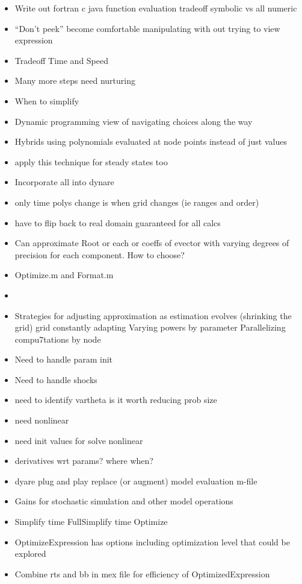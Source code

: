 \documentclass[12pt]{article}
\begin{document}
\begin{itemize}
\item Write out fortran c java function evaluation tradeoff symbolic vs all numeric
\item ``Don't peek'' become comfortable manipulating with out trying to view expression
\item Tradeoff Time and Speed
\item Many more steps need nurturing
\item When to simplify
\item Dynamic programming view of navigating choices along the way
\item Hybrids using polynomials evaluated at node points instead of just values
\item apply this technique for steady states too
\item Incorporate all into dynare
\item only time polys change is when grid changes (ie ranges and order)
\item have to flip back to real domain guaranteed for all calcs
\item Can approximate Root or each or coeffs of evector with varying degrees of precision for each component. How to choose?
\item Optimize.m\cite{sofroniou04} and Format.m\cite{sofroniou04a}
\item \cite{bhandari10}
\item Strategies for adjusting approximation as estimation evolves (shrinking the grid) grid constantly adapting Varying powers by parameter Parallelizing compu7tations by node
\item Need to handle param init
\item Need to handle shocks
\item need to identify vartheta is it worth reducing prob size
\item need nonlinear
\item need init values for solve  nonlinear
\item derivatives wrt params? where when?
\item dyare plug and play replace (or augment) model evaluation m-file
\item Gains for stochastic simulation and other model operations
\item Simplify time  FullSimplify time Optimize
\item OptimizeExpression has options including optimization level that could be explored
\item Combine rts and bb in mex file for efficiency of OptimizedExpression

\end{itemize}
\end{document}
